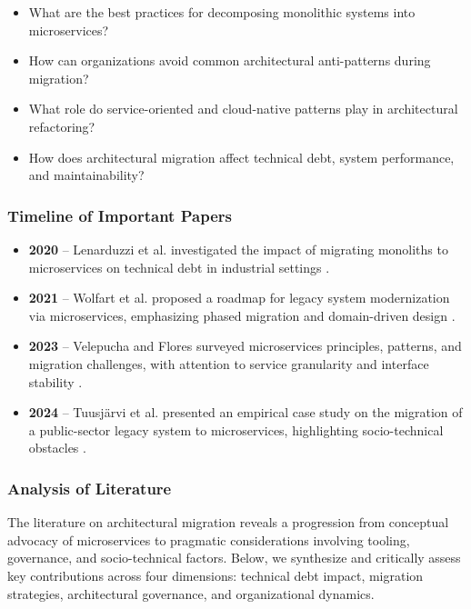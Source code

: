 \documentclass[12pt]{article}
\begin{document}
\begin{itemize}
    \item What are the best practices for decomposing monolithic systems into microservices?
    \item How can organizations avoid common architectural anti-patterns during migration?
    \item What role do service-oriented and cloud-native patterns play in architectural refactoring?
    \item How does architectural migration affect technical debt, system performance, and maintainability?
\end{itemize}

\subsubsection{Timeline of Important Papers}

\begin{itemize}
    \item \textbf{2020} – Lenarduzzi et al. investigated the impact of migrating monoliths to microservices on technical debt in industrial settings \cite{lenarduzzi2020}.
    \item \textbf{2021} – Wolfart et al. proposed a roadmap for legacy system modernization via microservices, emphasizing phased migration and domain-driven design \cite{wolfart2021}.
    \item \textbf{2023} – Velepucha and Flores surveyed microservices principles, patterns, and migration challenges, with attention to service granularity and interface stability \cite{velepucha2023}.
    \item \textbf{2024} – Tuusjärvi et al. presented an empirical case study on the migration of a public-sector legacy system to microservices, highlighting socio-technical obstacles \cite{tuusjarvi2024}.
\end{itemize}
\subsubsection{Analysis of Literature}

The literature on architectural migration reveals a progression from conceptual advocacy of microservices to pragmatic considerations involving tooling, governance, and socio-technical factors. Below, we synthesize and critically assess key contributions across four dimensions: technical debt impact, migration strategies, architectural governance, and organizational dynamics.
\end{document}
